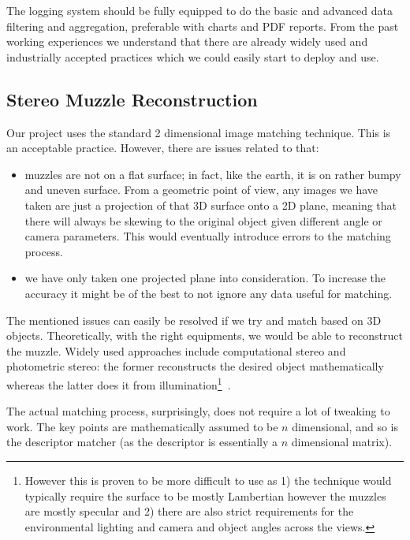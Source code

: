 The logging system should be fully equipped to do the basic and advanced data filtering and aggregation, preferable with charts and PDF reports. From the past working experiences we understand that there are already widely used and industrially accepted practices which we could easily start to deploy and use. 

\subsection{Stereo Muzzle Reconstruction}

Our project uses the standard 2 dimensional image matching technique. This is an acceptable practice. However, there are issues related to that:

\begin{itemize}
	\item muzzles are not on a flat surface; in fact, like the earth, it is on rather bumpy and uneven surface. From a geometric point of view, any images we have taken are just a projection of that 3D surface onto a 2D plane, meaning that there will always be skewing to the original object given different angle or camera parameters. This would eventually introduce errors to the matching process.
	\item we have only taken one projected plane into consideration. To increase the accuracy it might be of the best to not ignore any data useful for matching.
\end{itemize}

The mentioned issues can easily be resolved if we try and match based on 3D objects. Theoretically, with the right equipments, we would be able to reconstruct the muzzle. Widely used approaches include computational stereo and photometric stereo: the former reconstructs the desired object mathematically~\cite{computational_stereo} whereas the latter does it from illumination\footnote{However this is proven to be more difficult to use as 1) the technique would typically require the surface to be mostly Lambertian however the muzzles are mostly specular and 2) there are also strict requirements for the environmental lighting and camera and object angles across the views.}~\cite{photometric_stereo}.

The actual matching process, surprisingly, does not require a lot of tweaking to work. The key points are mathematically assumed to be $n$ dimensional, and so is the descriptor matcher (as the descriptor is essentially a $n$ dimensional matrix).